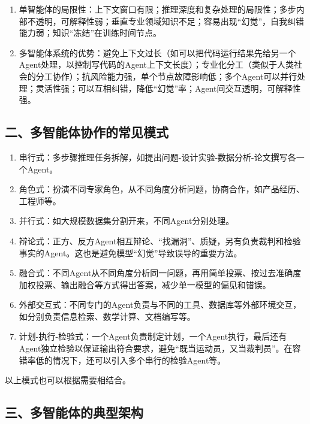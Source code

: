 \begin{enumerate}
\def\labelenumi{\arabic{enumi}.}
\item
  单智能体的局限性：上下文窗口有限；推理深度和复杂处理的局限性；多步内部不透明，可解释性弱；垂直专业领域知识不足；容易出现``幻觉''，自我纠错能力弱；知识``冻结''在训练时间节点。
\item
  多智能体系统的优势：避免上下文过长（如可以把代码运行结果先给另一个Agent处理，以控制写代码的Agent上下文长度）；专业化分工（类似于人类社会的分工协作）；抗风险能力强，单个节点故障影响低；多个Agent可以并行处理；灵活性强；可以互相纠错，降低``幻觉''率；Agent间交互透明，可解释性强。
\end{enumerate}

\hypertarget{ux4e8cux591aux667aux80fdux4f53ux534fux4f5cux7684ux5e38ux89c1ux6a21ux5f0f}{%
\subsection{二、多智能体协作的常见模式}\label{ux4e8cux591aux667aux80fdux4f53ux534fux4f5cux7684ux5e38ux89c1ux6a21ux5f0f}}

\begin{enumerate}
\def\labelenumi{\arabic{enumi}.}
\item
  串行式：多步骤推理任务拆解，如提出问题-设计实验-数据分析-论文撰写各一个Agent。
\item
  角色式：扮演不同专家角色，从不同角度分析问题，协商合作，如产品经历、工程师等。
\item
  并行式：如大规模数据集分割开来，不同Agent分别处理。
\item
  辩论式：正方、反方Agent相互辩论、``找漏洞''、质疑，另有负责裁判和检验事实的Agent。这也是避免模型``幻觉''导致误导的重要方法。
\item
  融合式：不同Agent从不同角度分析同一问题，再用简单投票、按过去准确度加权投票、输出融合等方式得出答案，减少单一模型的偏见和错误。
\item
  外部交互式：不同专门的Agent负责与不同的工具、数据库等外部环境交互，如分别负责信息检索、数学计算、文档编写等。
\item
  计划-执行-检验式：一个Agent负责制定计划，一个Agent执行，最后还有Agent独立检验以保证输出符合要求，避免``既当运动员，又当裁判员''。在容错率低的情况下，还可以引入多个串行的检验Agent等。
\end{enumerate}

以上模式也可以根据需要相结合。

\hypertarget{ux4e09ux591aux667aux80fdux4f53ux7684ux5178ux578bux67b6ux6784}{%
\subsection{三、多智能体的典型架构}\label{ux4e09ux591aux667aux80fdux4f53ux7684ux5178ux578bux67b6ux6784}}

